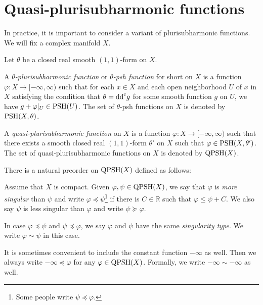 \section{Quasi-plurisubharmonic functions}
\label{sec:qpsh}
In practice, it is important to consider a variant of plurisubharmonic functions. We will fix a complex manifold $X$.

\begin{definition}\label{def:qpsh} Let $\theta$ be a closed real smooth $(1,1)$-form on $X$.

    A \emph{$\theta$-plurisubharmonic function} or \emph{$\theta$-psh function} for short on $X$ is a function $\varphi\colon X\rightarrow [-\infty,\infty)$ such that for each $x\in X$ and each open neighborhood $U$ of $x$ in $X$ satisfying the condition that $\theta=\mathrm{dd}^{\mathrm{c}} g$ for some smooth function $g$ on $U$, we have $g+\varphi|_U\in \mathrm{PSH}(U)$. The set of $\theta$-psh functions on $X$ is denoted by $\mathrm{PSH}(X,\theta)$. 

    A \emph{quasi-plurisubharmonic function}  on $X$ is a function $\varphi\colon X\rightarrow [-\infty,\infty)$ such that there exists a smooth closed real $(1,1)$-form $\theta'$ on $X$ such that $\varphi\in \mathrm{PSH}(X,\theta')$. The set of quasi-plurisubharmonic functions on $X$ is denoted by $\mathrm{QPSH}(X)$.
\end{definition}

There is a natural preorder on $\mathrm{QPSH}(X)$ defined as follows:
\begin{definition}\label{def:parorder}Assume that $X$ is compact.
    Given $\varphi,\psi\in \mathrm{QPSH}(X)$, we say that $\varphi$ is \emph{more singular} than $\psi$ and write $\varphi\preceq \psi$\index{$\varphi\preceq \psi$}\footnote{Some people write $\psi\preceq \varphi$.} if there is $C\in \mathbb{R}$ such that $\varphi\leq \psi+C$. We also say $\psi$ is less singular than $\varphi$ and write $\psi\succeq \varphi$.

    In case $\varphi\preceq \psi$ and $\psi\preceq \varphi$, we say $\varphi$ and $\psi$ have the same \emph{singularity type}. We write $\varphi\sim \psi$ \index{$\varphi\sim \psi$} in this case.
\end{definition}
It is sometimes convenient to include the constant function $-\infty$ as well. Then we always write $-\infty\preceq \varphi$ for any $\varphi\in \mathrm{QPSH}(X)$. Formally, we write $-\infty\sim -\infty$ as well.

